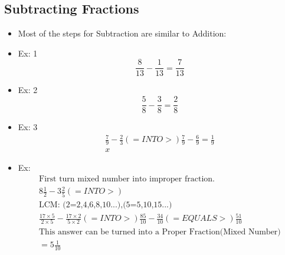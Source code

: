 \documentclass[]{article}
\begin{document}
\subsection{Subtracting Fractions}
\begin{itemize}
	\item Most of the steps for Subtraction are similar to Addition:
	\item Ex: 1
	\begin{equation}
		\frac{8}{13} - \frac{1}{13} = \frac{7}{13}
	\end{equation}
	\item Ex: 2
	\begin{equation}
		\frac{5}{8} - \frac{3}{8} = \frac{2}{8}
	\end{equation}
	\item Ex: 3
	\begin{align}
	\frac{7}{9} - \frac{2}{3} (=INTO>) \frac{7}{9} - \frac{6}{9} = \frac{1}{9}\\
	x
	\end{align}
	\item Ex:
	 \begin{gather*}
	 \text{First turn mixed number into improper fraction.} \\	
		8 \frac{1}{2} - 3 \frac{2}{5} (=INTO>)   \\
		\text{LCM: (2=2,4,6,8,10...),(5=5,10,15...)} \\
		\frac{17 \times 5}{2 \times 5} - \frac{17 \times 2}{5 \times 2} (=INTO>) \frac{85}{10} - \frac{34}{10} (=EQUALS>) \frac{51}{10}\\
		\text{This answer can be turned into a Proper Fraction(Mixed Number)} \\
		= 5 \frac{1}{10}
	\end{gather*}
	
	
	
\end{itemize}
\end{document}
